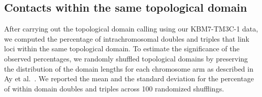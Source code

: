 \subsection*{Contacts within the same topological domain}
After carrying out the topological domain calling using our KBM7-TM3C-1 data,
we computed the percentage of intrachromosomal doubles and triples that
link loci within the same topological domain.
To estimate the significance of the observed percentages, we randomly
shuffled topological domains by preserving the distribution of
the domain lengths for each chromosome arm as described in Ay et
al.\ \cite{ay:statistical}. We reported the mean and the standard deviation
for the percentage of within domain doubles and triples across 100
randomized shufflings.


%


